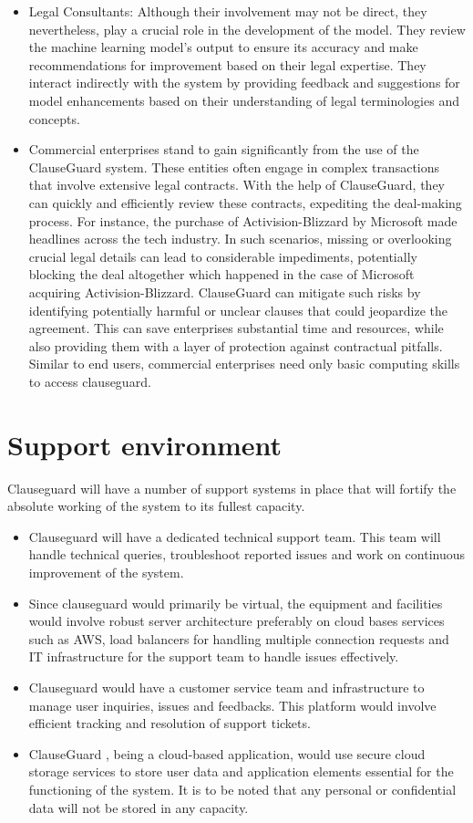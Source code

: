\begin{itemize}
    \item Legal Consultants: Although their involvement may not be direct, they nevertheless, play a crucial role in the development of the model. They review the machine learning model's output to ensure its accuracy and make recommendations for improvement based on their legal expertise. They interact indirectly with the system by providing feedback and suggestions for model enhancements based on their understanding of legal terminologies and concepts.
    \item Commercial enterprises stand to gain significantly from the use of the ClauseGuard system. These entities often engage in complex transactions that involve extensive legal contracts. With the help of ClauseGuard, they can quickly and efficiently review these contracts, expediting the deal-making process. For instance,  the  purchase of Activision-Blizzard by Microsoft made headlines across the tech industry. In such scenarios, missing or overlooking crucial legal details can lead to considerable impediments, potentially blocking the deal altogether which happened in the case of Microsoft acquiring Activision-Blizzard. ClauseGuard can mitigate such risks by identifying potentially harmful or unclear clauses that could jeopardize the agreement. This can save enterprises substantial time and resources, while also providing them with a layer of protection against contractual pitfalls. Similar to end users, commercial enterprises need only basic computing skills to access clauseguard. 

\end{itemize}


\section{Support environment \label{Section::Support Environment}}
Clauseguard will have a number of support systems in place that will fortify the absolute working of the system to its fullest capacity. 
\begin{itemize}
    \item Clauseguard will have a dedicated technical support team. This team will handle technical queries, troubleshoot reported issues and work on continuous improvement of the system. 
    \item Since clauseguard would primarily be virtual, the equipment and facilities would involve robust server architecture preferably on cloud bases services such as AWS, load balancers for handling multiple connection requests and IT infrastructure for the support team to handle issues effectively. 
    \item Clauseguard would have a customer service team and infrastructure to manage user inquiries, issues and feedbacks. This platform would involve efficient tracking and resolution of support tickets. 
    \item ClauseGuard , being a cloud-based application, would use secure cloud storage services to store user data and application elements essential for the functioning of the system. It is to be noted that any personal or confidential data will not be stored in any capacity. 
\end{itemize}





